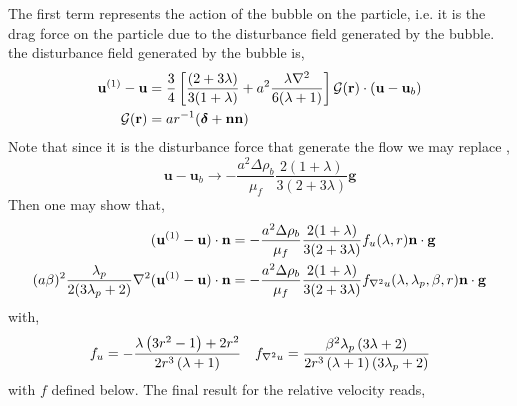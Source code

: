 The first term represents the action of the bubble on the particle, i.e. it is the drag force on the particle due to the disturbance field generated by the bubble.
the disturbance field generated by the bubble is, 
\begin{align*}
    \textbf{u}^{(1)} - \textbf{u}
    &=
    \frac{3}{4}\left[
        \frac{(2+3\lambda)}{3(1+\lambda)}
        + 
        a^2\frac{\lambda\mathbf{\nabla}^2}{6(\lambda+1)}
        \right]\mathcal{G}(\textbf{r})\cdot
    (\textbf{u}- \textbf{u}_b)\\
    \mathcal{G}(\textbf{r})
    &=
    a r^{-1}(\bm\delta + \textbf{nn})
\end{align*}
Note that since it is the disturbance force that generate the flow we may replace 
,
\begin{equation}
    \textbf{u}-\textbf{u}_b \to - \frac{a^2 \Delta \rho_b}{\mu_f}
    \frac{2(1+\lambda)}{3(2+3\lambda)}\textbf{g}
\end{equation}
Then one may show that, 
\begin{align}
    (\textbf{u}^{(1)} - \textbf{u})\cdot\textbf{n} &= 
    - \frac{a^2 \Delta \rho_b}{\mu_f}
    \frac{2(1+\lambda)}{3(2+3\lambda)}
    f_u(\lambda,r) \textbf{n}\cdot \textbf{g}\\
    (a\beta)^2 \frac{\lambda_p}{2(3\lambda_p +2)} \mathbf{\nabla}^2 (\textbf{u}^{(1)} - \textbf{u})\cdot \textbf{n}
    &=
    - \frac{a^2 \Delta \rho_b}{\mu_f}
    \frac{2(1+\lambda)}{3(2+3\lambda)}
    f_{\mathbf{\nabla}^2 u}(\lambda,\lambda_p,\beta,r) \textbf{n}\cdot \textbf{g}
\end{align}
with,
\begin{align}
    f_u = - \frac{\lambda \left(3 r^{2} - 1\right) + 2 r^{2}}{2 r^{3} \left(\lambda + 1\right)}
    &&
    f_{\mathbf{\nabla}^2 u } 
    =
    \frac{\beta^{2} \lambda_{p} \left(3 \lambda + 2\right)}{2 r^{3} \left(\lambda + 1\right) \left(3 \lambda_{p} + 2\right)}
\end{align}
with $f$ defined below. 
The final result for the relative velocity reads, 
